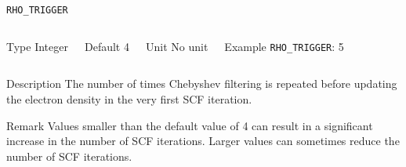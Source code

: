 \begin{frame}[allowframebreaks]{\texttt{RHO\_TRIGGER}} \label{RHO_TRIGGER}
\vspace*{-12pt}
\begin{columns}
\begin{block}{Type}
Integer
\end{block}

\begin{block}{Default}
4
\end{block}

\begin{block}{Unit}
No unit
\end{block}

\begin{block}{Example}
\texttt{RHO\_TRIGGER}: 5
\end{block}
\end{columns}

\begin{block}{Description}
The number of times Chebyshev filtering is repeated before updating the electron density in the very first SCF iteration.
\end{block}

\begin{block}{Remark}
Values smaller than the default value of 4 can result in a significant increase in the number of SCF
iterations. Larger values can sometimes reduce the number of SCF iterations. 
\end{block}

\end{frame}




